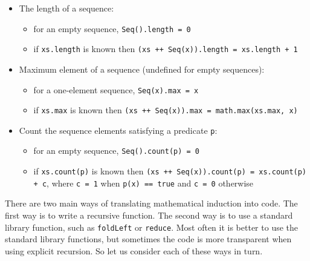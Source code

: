 \begin{itemize}
\item The length of a sequence:
\begin{itemize}
\item for an empty sequence, \lstinline!Seq().length = 0!
\item if \lstinline!xs.length!
is known then \lstinline!(xs ++ Seq(x)).length = xs.length + 1!
\end{itemize}
\item Maximum element of a sequence (undefined for empty sequences):
\begin{itemize}
\item for a one-element sequence, \lstinline!Seq(x).max = x! 
\item if \lstinline!xs.max! is
known then \lstinline!(xs ++ Seq(x)).max = math.max(xs.max, x)!
\end{itemize}
\item Count the sequence elements satisfying a predicate \lstinline!p!:
\begin{itemize}
\item for an empty sequence, \lstinline!Seq().count(p) = 0!
\item if \lstinline!xs.count(p)!
is known then \lstinline!(xs ++ Seq(x)).count(p) = xs.count(p) + c!,
where \lstinline!c = 1!
when \lstinline!p(x) == true!
and \lstinline!c = 0! otherwise
\end{itemize}
\end{itemize}
There are two main ways of translating mathematical induction into
code. The first way is to write a recursive function. The second way
is to use a standard library function, such as \lstinline!foldLeft!
or \lstinline!reduce!.
Most often it is better to use the standard library functions, but
sometimes the code is more transparent when using explicit recursion.
So let us consider each of these ways in turn.

